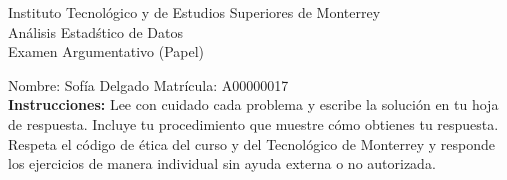 \documentclass[10pt]{report}
\begin{document}
\newpage



\begin{center}
{\large Instituto Tecnol\'{o}gico y de Estudios Superiores de Monterrey \\
An\'alisis Estad\'stico de Datos } \\
Examen Argumentativo (Papel)
\end{center}

Nombre: \underline{\hspace*{.2in}}
Sofía Delgado
\underline{\hspace*{.2in}} \quad Matr\'icula:\underline{\hspace*{.2in}}
A00000017
\underline{\hspace*{.2in}} \\

{\bf Instrucciones:} Lee con cuidado cada problema y escribe la soluci\'on
en tu hoja de respuesta. Incluye tu procedimiento que muestre c\'omo obtienes tu respuesta.  Respeta el c\'odigo de \'etica del curso y del Tecnol\'ogico de Monterrey y responde los ejercicios de manera individual sin ayuda externa o no autorizada.
\end{document}
